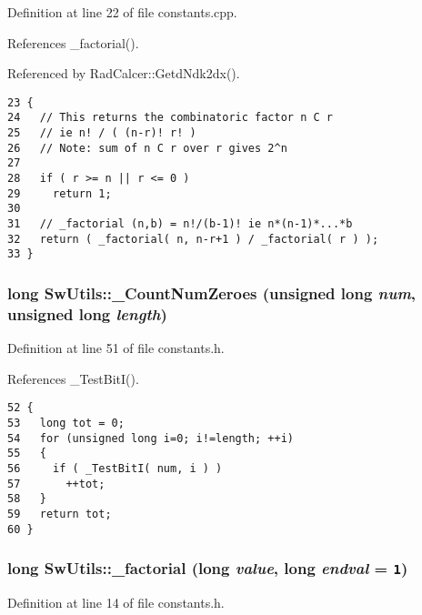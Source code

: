 Definition at line 22 of file constants.cpp.

References \_\-factorial().

Referenced by RadCalcer::GetdNdk2dx().

\begin{Code}\begin{verbatim}23 {
24   // This returns the combinatoric factor n C r
25   // ie n! / ( (n-r)! r! )
26   // Note: sum of n C r over r gives 2^n
27 
28   if ( r >= n || r <= 0 )
29     return 1;
30 
31   // _factorial (n,b) = n!/(b-1)! ie n*(n-1)*...*b
32   return ( _factorial( n, n-r+1 ) / _factorial( r ) );
33 }
\end{verbatim}
\end{Code}


\subsubsection{\setlength{\rightskip}{0pt plus 5cm}long SwUtils::\_\-CountNumZeroes (unsigned long {\em num}, unsigned long {\em length})\hspace{0.3cm}{\tt  [inline]}}\label{namespaceSwUtils_3b26ae74b9091b6bf31b181cb245c7c1}




Definition at line 51 of file constants.h.

References \_\-TestBitI().

\begin{Code}\begin{verbatim}52 {
53   long tot = 0;
54   for (unsigned long i=0; i!=length; ++i)
55   {
56     if ( _TestBitI( num, i ) )
57       ++tot;
58   }
59   return tot;
60 }
\end{verbatim}
\end{Code}


\subsubsection{\setlength{\rightskip}{0pt plus 5cm}long SwUtils::\_\-factorial (long {\em value}, long {\em endval} = {\tt 1})\hspace{0.3cm}{\tt  [inline]}}\label{namespaceSwUtils_3bf3423904e7b04ce19649b33bb7de77}




Definition at line 14 of file constants.h.

